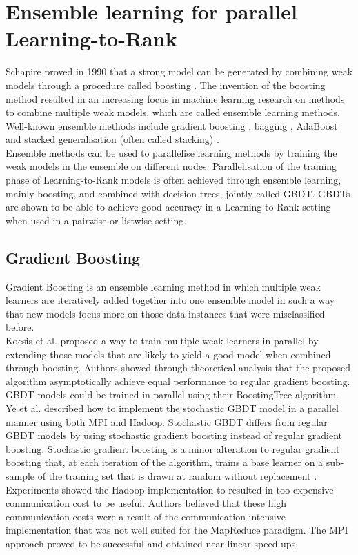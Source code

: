 \section{Ensemble learning for parallel Learning-to-Rank}
Schapire proved in 1990 that a strong model can be generated by combining weak models through a procedure called boosting \cite{Schapire1990}. The invention of the boosting method resulted in an increasing focus in machine learning research on methods to combine multiple weak models, which are called ensemble learning methods. Well-known ensemble methods include gradient boosting \cite{Friedman2001}, bagging \cite{Breiman1996}, AdaBoost \cite{Freund1997} and stacked generalisation (often called stacking) \cite{Wolpert1992}.\\

Ensemble methods can be used to parallelise learning methods by training the weak models in the ensemble on different nodes. Parallelisation of the training phase of Learning-to-Rank models is often achieved through ensemble learning, mainly boosting, and combined with decision trees, jointly called \acf{GBDT}. \ac{GBDT}s are shown to be able to achieve good accuracy in a Learning-to-Rank setting when used in a pairwise \cite{Zheng2007} or listwise \cite{Chen2008} setting.

\subsection{Gradient Boosting}
Gradient Boosting \cite{Friedman2001} is an ensemble learning method in which multiple weak learners are iteratively added together into one ensemble model in such a way that new models focus more on those data instances that were misclassified before.\\

Kocsis et al. \cite{Kocsis2013} proposed a way to train multiple weak learners in parallel by extending those models that are likely to yield a good model when combined through boosting. Authors showed through theoretical analysis that the proposed algorithm asymptotically achieve equal performance to regular gradient boosting. \ac{GBDT} models could be trained in parallel using their BoostingTree algorithm.\\

Ye et al. \cite{Ye2009} described how to implement the stochastic \ac{GBDT} model in a parallel manner using both MPI and Hadoop. Stochastic \ac{GBDT} differs from regular \ac{GBDT} models by using stochastic gradient boosting instead of regular gradient boosting. Stochastic gradient boosting is a minor alteration to regular gradient boosting that, at each iteration of the algorithm, trains a base learner on a sub-sample of the training set that is drawn at random without replacement \cite{Friedman2002}. Experiments showed the Hadoop implementation to resulted in too expensive communication cost to be useful. Authors believed that these high communication costs were a result of the communication intensive implementation that was not well suited for the MapReduce paradigm. The MPI approach proved to be successful and obtained near linear speed-ups.\\


